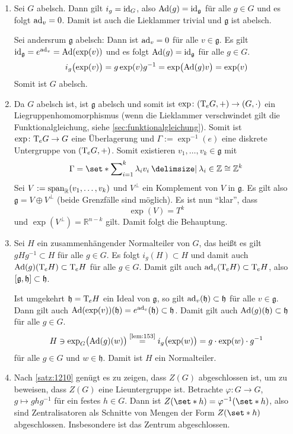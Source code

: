 \begin{beweis}
	\begin{enumerate}[1)]
		\item Sei $G$ abelsch. Dann gilt $i_g=\id_G$, also $\Ad(g) = \id_{\mathfrak{g}}$ für alle $g \in G$ und es folgt $\ad_v=0$. Damit ist auch die Lieklammer trivial und $\mathfrak{g}$ ist abelsch.
		
		Sei andersrum $\mathfrak{g}$ abelsch: Dann ist $\ad_v=0$ für alle $v \in \mathfrak{g}$. Es gilt $\id_{\mathfrak{g}} = e^{\ad_v} = \Ad \enbrace*{\exp(v)}$ und es folgt $\Ad(g) = \id_{\mathfrak{g}} $ für alle $g \in G$.
		\[
			i_g \enbrace[\big]{\exp(v)} =  g \exp(v) g^{-1} = \exp \enbrace[\big]{\Ad(g)v} = \exp(v)
		\]
		Somit ist $G$ abelsch.
		\item Da $G$ abelsch ist, ist $\mathfrak{g}$ abelsch und somit ist $\exp \colon (\Tmap_eG,+) \to (G,\cdot )$ ein Liegruppenhomomorphismus (wenn die Lieklammer verschwindet gilt die Funktionalgleichung, siehe \cref{sec:funktionalgleichung}).
		Somit ist $\exp \colon \Tmap_e G \to G$ eine Überlagerung und $\Gamma := \exp^{-1}(e)$ eine diskrete Untergruppe von $(\Tmap_e G,+)$.
		Somit existieren $v_1, \ldots, v_k \in \mathfrak{g}$ mit
		\[
			\Gamma = \set*{\sum\nolimits_{i=1}^{k} \lambda_i v_i \given \lambda_i \in \mathbb{Z}} \cong \mathbb{Z}^k
		\]
		Sei $V := \Span_\mathbb{R}(v_1,\ldots ,v_k)$ und $V^\bot$ ein Komplement von $V$ in $\mathfrak{g}$.
		Es gilt also $\mathfrak{g} = V \oplus V^\bot$ (beide Grenzfälle sind möglich).
		Es ist nun \enquote{klar}, dass 
		\[
			\exp(V) = T^k
		\]
		und $\exp(V^\bot) = \mathbb{R}^{n-k}$ gilt. 
		Damit folgt die Behauptung.
		\item Sei $H$ ein zusammenhängender Normalteiler von $G$, das heißt es gilt $g H g^{-1} \subset H$ für alle $g \in G$.
		Es folgt $i_g(H) \subset H$ und damit auch $\Ad(g)(\Tmap_eH) \subset \Tmap_eH$ für alle $g \in G$.
		Damit gilt auch $\ad_v(\Tmap_e H) \subset \Tmap_e H$, also $\benbrace*{\mathfrak{g},\mathfrak{h}}\subset \mathfrak{h}$.
		
		Ist umgekehrt $\mathfrak{h} = \Tmap_e H$ ein Ideal von $\mathfrak{g}$, so gilt $\ad_v(\mathfrak{h}) \subset \mathfrak{h}$ für alle $v \in \mathfrak{g}$.
		Dann gilt auch $\Ad \enbrace*{\exp (v)}(\mathfrak{h}) = e^{\ad_v}(\mathfrak{h}) \subset \mathfrak{h}$.
		Damit gilt auch $\Ad(g)(\mathfrak{h}) \subset \mathfrak{h}$ für alle $g \in G$.
		\begin{align}
			H \ni \exp_G \enbrace[\big]{\Ad(g)(w)} \StackText{\ref{lem:153}}{=} i_g \enbrace[\big]{\exp(w)}= g \cdot \exp(w) \cdot g^{-1} 
		\end{align}
		für alle $g \in G$ und $w \in \mathfrak{h}$.
		Damit ist $H$ ein Normalteiler.
		\item Nach \autoref{satz:1210} genügt es zu zeigen, dass $Z(G)$ abgeschlossen ist, um zu beweisen, dass $Z(G)$ eine Lieuntergruppe ist.
		Betrachte $\varphi \colon G \to G$, $g \mapsto g h g^{-1}$ für ein festes $h \in G$. 
		Dann ist $Z(\set*{h}) = \varphi^{-1}(\set*{h})$, also sind Zentralisatoren als Schnitte von Mengen der Form $Z(\set*{h})$ abgeschlossen. 
		Insbesondere ist das Zentrum abgeschlossen.
		

\end{enumerate}
\end{beweis}
